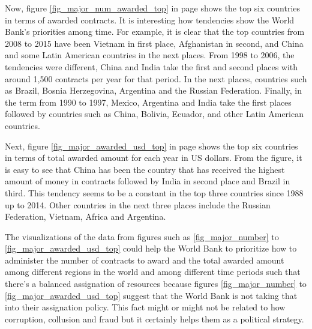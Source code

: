 Now, figure \ref{fig_major_num_awarded_top} in  page \pageref{fig_major_num_awarded_top} shows the top six countries  in terms of awarded contracts. It is interesting how tendencies show the World Bank's priorities among time. For example, it is clear that the top countries from 2008 to 2015 have been Vietnam in first place, Afghanistan in second, and China and some Latin American countries in the next places. From 1998 to 2006, the tendencies were different, China and India take the first and second places with around 1,500 contracts per year for that period. In the next places, countries such as Brazil, Bosnia Herzegovina,  Argentina and the Russian Federation. Finally, in the term from 1990 to 1997, Mexico, Argentina and India take the first places followed by countries such as China, Bolivia, Ecuador, and other Latin American countries.

Next, figure \ref{fig_major_awarded_usd_top} in page \pageref{fig_major_awarded_usd_top} shows the top six countries  in terms of total awarded amount for each year in US dollars. From the figure, it is easy to see that China has been the country that has received the highest amount of money in contracts followed by India in second place and Brazil in third. This tendency seems to be a constant in the top three countries since 1988 up to 2014. Other countries in the next three places include the Russian Federation, Vietnam, Africa and Argentina.

The visualizations of  the data from figures such as \ref{fig_major_number} to  \ref{fig_major_awarded_usd_top} could help the World Bank to prioritize how to administer the number of contracts to award and the total awarded amount among different regions in the world and among different time periods such that there's a balanced assignation of resources because figures  \ref{fig_major_number} to  \ref{fig_major_awarded_usd_top} suggest that the World Bank is not taking that into their assignation policy. This fact might or might not be related to how corruption, collusion and fraud but it certainly helps them as a political strategy.

